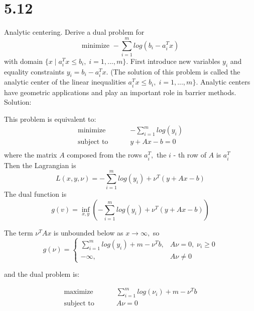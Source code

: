 \documentclass{article}
\begin{document}
\section*{5.12}
Analytic centering. Derive a dual problem for 
$$\text{minimize } - \sum_{i = 1}^{m} log(b_i - a_i^T x)$$
with domain 
$\{x\; | \;  a_i^T x \leq b_i, \; i = 1, ..., m\}.$ First introduce new variables $y_i$ and equality constraints $y_i = b_i - a_i^T x.$ (The solution of this problem is called the analytic center of the linear inequalities $a_i^T x \leq b_i, \; i = 1, ..., m\}.$ 
Analytic centers have geometric applications and play an
important role in barrier methods. \\

Solution:

This problem is equivalent to:
\begin{align*}
\text{minimize } \qquad & - \sum_{i = 1}^{m} log(y_i) \\
\text{subject to } \qquad &y + A x - b = 0 \\
\end{align*}
where the matrix $A$ composed from the rows $a_i^T,$ the $i$ - th row of $A$ is $a_i^T$\\
Then the Lagrangian is\\
$$
L(x, y, \nu) = - \sum_{i = 1}^{m} log(y_i) + 
\nu^T(y + A x - b)
$$
The dual function is
$$
g(v) = \inf_{x, y}( - \sum_{i = 1}^{m} log(y_i) + 
\nu^T(y + A x - b))
$$

The term $\nu^TAx$ is unbounded below as 
$x \rightarrow \infty,$ so \\

\begin{equation*}
g(\nu) =
\begin{cases}
\sum_{i = 1}^{m} log(y_i) + m - \nu^T b , 	
& A \nu = 0, \; \nu_i \geq 0  \\
- \infty, 					& A \nu \neq 0 
\end{cases}       
\end{equation*}

and the dual problem is:

\begin{align*}
\text{maximize } \qquad 
& \sum_{i = 1}^{m} log(\nu_i) + m - \nu^T b \\
\text{subject to } \qquad & A \nu = 0
\end{align*}
\end{document}
